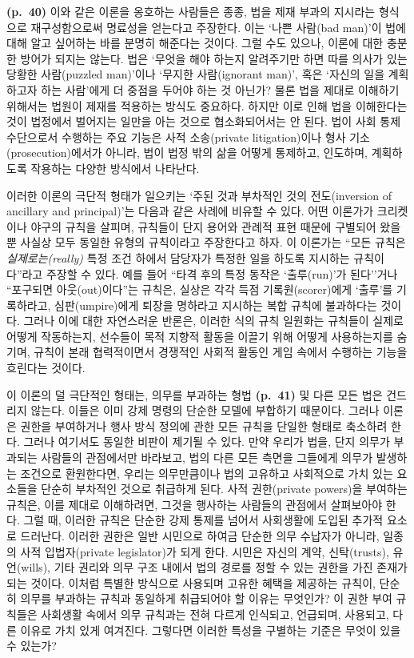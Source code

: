 \documentclass[12pt, oneside]{book}  %
\begin{document}
\textbf{(p.~40)} 이와 같은 이론을 옹호하는 사람들은 종종, 법을 제재
부과의 지시라는 형식으로 재구성함으로써 명료성을 얻는다고 주장한다. 이는
`나쁜 사람(bad man)'이 법에 대해 알고 싶어하는 바를 분명히 해준다는
것이다. 그럴 수도 있으나, 이론에 대한 충분한 방어가 되지는 않는다. 법은
`무엇을 해야 하는지 알려주기만 하면 따를 의사가 있는 당황한 사람(puzzled
man)'이나 `무지한 사람(ignorant man)', 혹은 `자신의 일을 계획하고자 하는
사람'에게 더 중점을 두어야 하는 것 아닌가? 물론 법을 제대로 이해하기
위해서는 법원이 제재를 적용하는 방식도 중요하다. 하지만 이로 인해 법을
이해한다는 것이 법정에서 벌어지는 일만을 아는 것으로 협소화되어서는 안
된다. 법이 사회 통제 수단으로서 수행하는 주요 기능은 사적 소송(private
litigation)이나 형사 기소(prosecution)에서가 아니라, 법이 법정 밖의 삶을
어떻게 통제하고, 인도하며, 계획하도록 작용하는 다양한 방식에서 나타난다.

이러한 이론의 극단적 형태가 일으키는 `주된 것과 부차적인 것의
전도(inversion of ancillary and principal)'는 다음과 같은 사례에 비유할
수 있다. 어떤 이론가가 크리켓이나 야구의 규칙을 살피며, 규칙들이 단지
용어와 관례적 표현 때문에 구별되어 왔을 뿐 사실상 모두 동일한 유형의
규칙이라고 주장한다고 하자. 이 이론가는 ``모든 규칙은
\emph{실제로는(really)} 특정 조건 하에서 담당자가 특정한 일을 하도록
지시하는 규칙이다''라고 주장할 수 있다. 예를 들어 ``타격 후의 특정
동작은 `출루(run)'가 된다''거나 ``포구되면 아웃(out)이다''는 규칙은,
실상은 각각 득점 기록원(scorer)에게 `출루'를 기록하라고,
심판(umpire)에게 퇴장을 명하라고 지시하는 복합 규칙에 불과하다는 것이다.
그러나 이에 대한 자연스러운 반론은, 이러한 식의 규칙 일원화는 규칙들이
실제로 어떻게 작동하는지, 선수들이 목적 지향적 활동을 이끌기 위해 어떻게
사용하는지를 숨기며, 규칙이 본래 협력적이면서 경쟁적인 사회적 활동인
게임 속에서 수행하는 기능을 흐린다는 것이다.

이 이론의 덜 극단적인 형태는, 의무를 부과하는 형법 \textbf{(p.~41)} 및
다른 모든 법은 건드리지 않는다. 이들은 이미 강제 명령의 단순한 모델에
부합하기 때문이다. 그러나 이론은 권한을 부여하거나 행사 방식 정의에 관한
모든 규칙을 단일한 형태로 축소하려 한다. 그러나 여기서도 동일한 비판이
제기될 수 있다. 만약 우리가 법을, 단지 의무가 부과되는 사람들의
관점에서만 바라보고, 법의 다른 모든 측면을 그들에게 의무가 발생하는
조건으로 환원한다면, 우리는 의무만큼이나 법의 고유하고 사회적으로 가치
있는 요소들을 단순히 부차적인 것으로 취급하게 된다. 사적 권한(private
powers)을 부여하는 규칙은, 이를 제대로 이해하려면, 그것을 행사하는
사람들의 관점에서 살펴보아야 한다. 그럴 때, 이러한 규칙은 단순한 강제
통제를 넘어서 사회생활에 도입된 추가적 요소로 드러난다. 이러한 권한은
일반 시민으로 하여금 단순한 의무 수납자가 아니라, 일종의 사적
입법자(private legislator)가 되게 한다. 시민은 자신의 계약,
신탁(trusts), 유언(wills), 기타 권리와 의무 구조 내에서 법의 경로를 정할
수 있는 권한을 가진 존재가 되는 것이다. 이처럼 특별한 방식으로 사용되며
고유한 혜택을 제공하는 규칙이, 단순히 의무를 부과하는 규칙과 동일하게
취급되어야 할 이유는 무엇인가? 이 권한 부여 규칙들은 사회생활 속에서
의무 규칙과는 전혀 다르게 인식되고, 언급되며, 사용되고, 다른 이유로 가치
있게 여겨진다. 그렇다면 이러한 특성을 구별하는 기준은 무엇이 있을 수
있는가?
\end{document}
